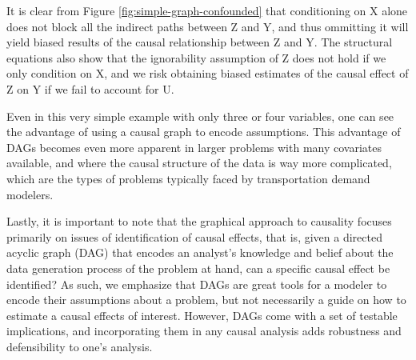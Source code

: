 It is clear from Figure \ref{fig:simple-graph-confounded} that conditioning on X alone does not block all the indirect paths between Z and Y, and thus ommitting it 
will yield biased results of the causal relationship between Z and Y. The structural equations also show that the ignorability assumption 
of Z does not hold if we only condition on X, and we risk obtaining biased estimates of the causal effect of Z on Y if we fail to 
account for U. 

Even in this very simple example with only three or four variables, one can see the advantage of using a causal graph to encode assumptions. 
This advantage of DAGs becomes even more apparent in larger problems with many covariates available, and where the causal structure of the data is way more complicated, which are the types of problems typically faced by transportation demand modelers. 



Lastly, it is important to note that the graphical approach to causality focuses 
primarily on issues of identification of causal effects, that is, given a 
directed acyclic graph (DAG) that encodes an analyst's knowledge and belief 
about the data generation process of the problem at hand, can a specific 
causal effect be identified? As such, we emphasize that DAGs are great tools 
for a modeler to encode their assumptions about a problem, but not necessarily 
a guide on how to estimate a causal effects of interest. However, DAGs come 
with a set of testable implications, and incorporating them in any causal 
analysis adds robustness and defensibility to one's analysis. 





